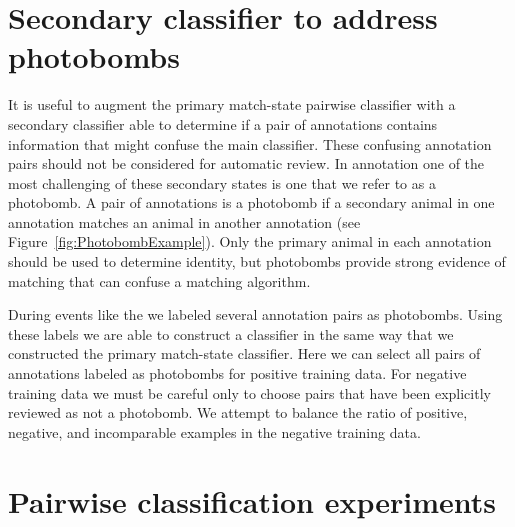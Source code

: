 \section{Secondary classifier to address photobombs}\label{sec:learnpb}
    It is useful to augment the primary match-state pairwise classifier with a secondary classifier able to
      determine if a pair of annotations contains information that might confuse the main classifier.
    These confusing annotation pairs should not be considered for automatic review.
    In annotation one of the most challenging of these secondary states is one that we refer to as a {photobomb}.
    A pair of annotations is a photobomb if a secondary animal in one annotation matches an animal in another
      annotation (\eg see Figure~\ref{fig:PhotobombExample}).
    Only the primary animal in each annotation should be used to determine identity, but photobombs provide
      strong evidence of matching that can confuse a matching algorithm.

    \PhotobombExample{}

    During events like the \GZC{} we labeled several annotation pairs as photobombs.
    Using these labels we are able to construct a classifier in the same way that we constructed the primary
      match-state classifier.
    Here we can select all pairs of annotations labeled as photobombs for positive training data.
    For negative training data we must be careful only to choose pairs that have been explicitly reviewed as not
      a photobomb.
    We attempt to balance the ratio of positive, negative, and incomparable examples in the negative training
      data.

\section{Pairwise classification experiments}\label{sec:pairexpt}


